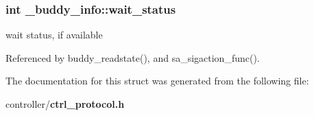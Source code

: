 \subsubsection[{wait\_\-status}]{\setlength{\rightskip}{0pt plus 5cm}int {\bf \_\-buddy\_\-info::wait\_\-status}}\label{struct__buddy__info_a60504b45dc317e3607852855a74f6904}
wait status, if available 

Referenced by buddy\_\-readstate(), and sa\_\-sigaction\_\-func().



The documentation for this struct was generated from the following file:\begin{DoxyCompactItemize}
\item 
controller/{\bf ctrl\_\-protocol.h}\end{DoxyCompactItemize}
